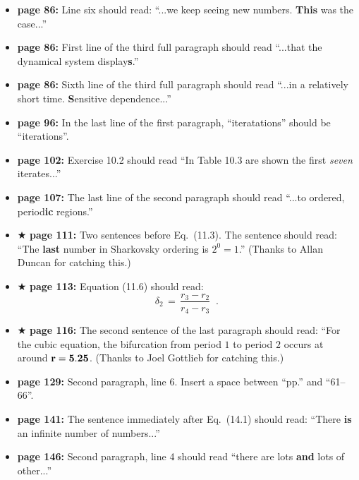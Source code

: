 \documentclass[12pt]{article}
\begin{document}
\begin{itemize}
  \item {\bf page 86:}  Line six should read: ``...we keep seeing new
    numbers.  {\bf This} was the case...'' 

  \item {\bf page 86:} First line of the third full paragraph should
    read ``...that the dynamical system display{\bf s}.''

  \item {\bf page 86:} Sixth line of the third full paragraph should
    read ``...in a relatively short time.  {\bf S}ensitive
    dependence...'' 

  \item {\bf page 96:}  In the last line of the first paragraph,
    ``iteratations'' should be ``iterations''.  %

  \item {\bf page 102:}  Exercise 10.2 should read ``In Table 10.3 are 
    shown the first {\em seven} iterates...''

  \item {\bf page 107:} The last line of the second paragraph should
    read ``...to ordered, period{\bf ic} regions.'' %

  \item $\bigstar$ {\bf page 111:}  Two sentences before Eq.~(11.3).  The
    sentence should read: ``The {\bf last} number in Sharkovsky
    ordering is $2^0 = 1$.''  (Thanks to Allan Duncan for catching
    this.) 

  \item $\bigstar$ {\bf page 113:}  Equation (11.6) should read:
$$
\delta_2 \, = \, \frac{ r_3 - r_2}{r_4 - r_3} \;\;.
$$

  \item $\bigstar$ {\bf page 116:}  The second sentence of the last
    paragraph should read: ``For the cubic equation, the bifurcation
    from period $1$ to period $2$ occurs at around ${\bf r=5.25}$.
(Thanks to Joel Gottlieb for catching this.)


  \item {\bf page 129:}  Second paragraph, line 6.  Insert a space
    between ``pp.''  and ``61--66''.

  \item {\bf page 141:}  The sentence immediately after Eq.~(14.1)
    should read: ``There {\bf is} an infinite number of numbers...''

  \item {\bf page 146:}  Second paragraph, line 4 should read ``there
    are lots {\bf and} lots of other...'' %


\end{itemize}
\end{document}
